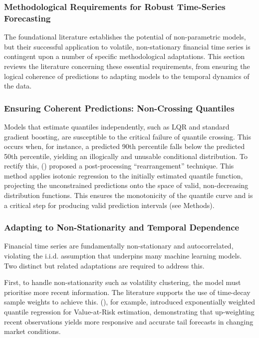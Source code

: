 \documentclass[
  a4paper,
  DIV=11,
  numbers=noendperiod]{scrreprt}
\begin{document}
\subsubsection{Methodological Requirements for Robust Time-Series
Forecasting}\label{methodological-requirements-for-robust-time-series-forecasting}

The foundational literature establishes the potential of non-parametric
models, but their successful application to volatile, non-stationary
financial time series is contingent upon a number of specific
methodological adaptations. This section reviews the literature
concerning these essential requirements, from ensuring the logical
coherence of predictions to adapting models to the temporal dynamics of
the data.

\subsubsection{Ensuring Coherent Predictions: Non-Crossing
Quantiles}\label{ensuring-coherent-predictions-non-crossing-quantiles}

Models that estimate quantiles independently, such as LQR and standard
gradient boosting, are susceptible to the critical failure of quantile
crossing. This occurs when, for instance, a predicted 90th percentile
falls below the predicted 50th percentile, yielding an illogically and
unusable conditional distribution. To rectify this,
() proposed a post-processing ``rearrangement'' technique.
This method applies isotonic regression to the initially estimated
quantile function, projecting the unconstrained predictions onto the
space of valid, non-decreasing distribution functions. This ensures the
monotonicity of the quantile curve and is a critical step for producing
valid prediction intervals (see Methods).

\subsubsection{Adapting to Non-Stationarity and Temporal
Dependence}\label{adapting-to-non-stationarity-and-temporal-dependence}

Financial time series are fundamentally non-stationary and
autocorrelated, violating the i.i.d. assumption that underpins many
machine learning models. Two distinct but related adaptations are
required to address this.

First, to handle non-stationarity such as volatility clustering, the
model must prioritise more recent information. The literature supports
the use of time-decay sample weights to achieve this.
(), for example, introduced
exponentially weighted quantile regression for Value-at-Risk estimation,
demonstrating that up-weighting recent observations yields more
responsive and accurate tail forecasts in changing market conditions.
\end{document}
